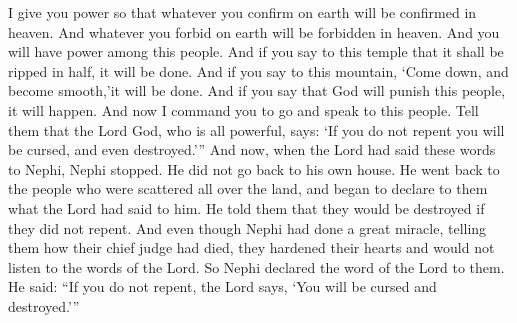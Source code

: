 I give you power so that whatever you confirm on earth will be confirmed in heaven. And whatever you forbid on earth will be forbidden in heaven. And you will have power among this people.
\bverse \iffalse And thus, if ye shall say unto this temple it shall be rent in twain, it shall be done. \fi
And if you say to this temple that it shall be ripped in half, it will be done.
\bverse \iffalse And if ye shall say unto this mountain, Be thou cast down and become smooth, it shall be done. \fi
And if you say to this mountain, \lq Come down, and become smooth,\rq it will be done.
\bverse \iffalse And behold, if ye shall say that God shall smite this people, it shall come to pass. \fi
And if you say that God will punish this people, it will happen.
\bverse \iffalse And now behold, I command you, that ye shall go and declare unto this people, that thus saith the Lord God, who is the Almighty: Except ye repent ye shall be smitten, even unto destruction. \fi
And now I command you to go and speak to this people. Tell them that the Lord God, who is all powerful, says: \lq If you do not repent you will be cursed, and even destroyed.\rq ''
\bverse \iffalse And behold, now it came to pass that when the Lord had spoken these words unto Nephi, he did stop and did not go unto his own house, but did return unto the multitudes who were scattered about upon the face of the land, and began to declare unto them the word of the Lord which had been spoken unto him, concerning their destruction if they did not repent. \fi
And now, when the Lord had said these words to Nephi, Nephi stopped. He did not go back to his own house. He went back to the people who were scattered all over the land, and began to declare to them what the Lord had said to him. He told them that they would be destroyed if they did not repent.
\bverse \iffalse Now behold, notwithstanding that great miracle which Nephi had done in telling them concerning the death of the chief judge, they did harden their hearts and did not hearken unto the words of the Lord. \fi
And even though Nephi had done a great miracle, telling them how their chief judge had died, they hardened their hearts and would not listen to the words of the Lord.
\bverse \iffalse Therefore Nephi did declare unto them the word of the Lord, saying: Except ye repent, thus saith the Lord, ye shall be smitten even unto destruction. \fi
So Nephi declared the word of the Lord to them. He said: ``If you do not repent, the Lord says, \lq You will be cursed and destroyed.\rq ''
